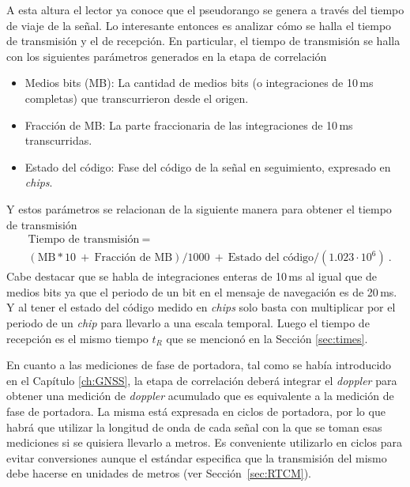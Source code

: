 \documentclass[a4paper,12pt,oneside,onecolumn,final,openright]{book}%
\begin{document}
	A esta altura el lector ya conoce que el pseudorango se genera a través del tiempo de viaje de la señal. Lo interesante entonces es analizar cómo se halla el tiempo de transmisión y el de recepción. En particular, el tiempo de transmisión se halla con los siguientes parámetros generados en la etapa de correlación
\begin{itemize}
	\item Medios bits (MB): La cantidad de medios bits (o integraciones de 10\,ms completas) que transcurrieron desde el origen. 
	\item Fracción de MB: La parte fraccionaria de las integraciones de 10\,ms transcurridas.
	\item Estado del código: Fase del código de la señal en seguimiento, expresado en \textit{chips}.
\end{itemize}
	Y estos parámetros se relacionan de la siguiente manera para obtener el tiempo de transmisión
\begin{align}
	&\text{Tiempo de transmisión} \ = \\ &\left(\text{MB}*10 \ + \ \text{Fracción de MB} \right)/1000 \ + \ \text{Estado del código}/(1.023\cdot 10^6) \ \nonumber.
\end{align}
	Cabe destacar que se habla de integraciones enteras de 10\,ms al igual que de medios bits ya que el periodo de un bit en el mensaje de navegación es de 20\,ms. Y al tener el estado del código medido en \textit{chips} solo basta con multiplicar por el periodo de un \textit{chip} para llevarlo a una escala temporal. Luego el tiempo de recepción es el mismo tiempo $t_R$ que se mencionó en la Sección \ref{sec:times}.
	
	En cuanto a las mediciones de fase de portadora, tal como se había introducido en el Capítulo \ref{ch:GNSS}, la etapa de correlación deberá integrar el \textit{doppler} para obtener una medición de \textit{doppler} acumulado que es equivalente a la medición de fase de portadora. La misma está expresada en ciclos de portadora, por lo que habrá que utilizar la longitud de onda de cada señal con la que se toman esas mediciones si se quisiera llevarlo a metros. Es conveniente utilizarlo en ciclos para evitar conversiones aunque el estándar especifica que la transmisión del mismo debe hacerse en unidades de metros (ver Sección~\ref{sec:RTCM}).
\end{document}

